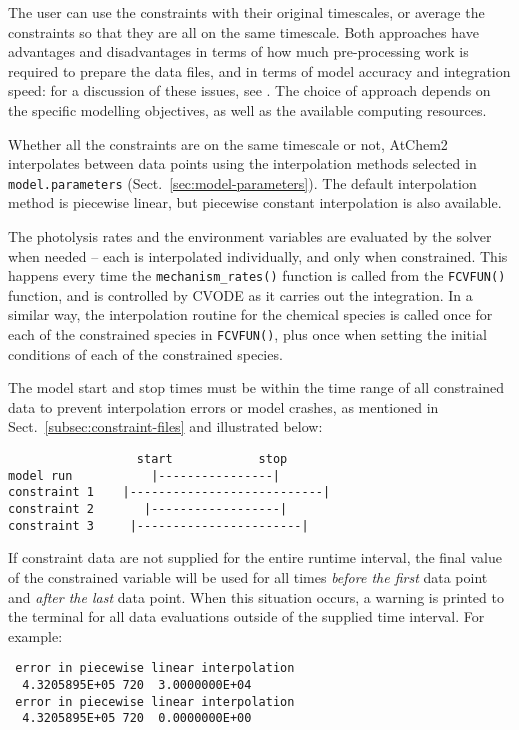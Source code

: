 The user can use the constraints with their original timescales, or
average the constraints so that they are all on the same timescale.
Both approaches have advantages and disadvantages in terms of how much
pre-processing work is required to prepare the data files, and in
terms of model accuracy and integration speed: for a discussion of
these issues, see \citet{sommariva_2020}. The choice of approach
depends on the specific modelling objectives, as well as the available
computing resources.

Whether all the constraints are on the same timescale or not, AtChem2
interpolates between data points using the interpolation methods
selected in \texttt{model.parameters} (Sect.~\ref{sec:model-parameters}).
The default interpolation method is piecewise linear, but piecewise
constant interpolation is also available.

The photolysis rates and the environment variables are evaluated by the
solver when needed -- each is interpolated individually, and only when
constrained. This happens every time the \texttt{mechanism\_rates()}
function is called from the \texttt{FCVFUN()} function, and is
controlled by CVODE as it carries out the integration. In a similar
way, the interpolation routine for the chemical species is called once
for each of the constrained species in \texttt{FCVFUN()}, plus once
when setting the initial conditions of each of the constrained
species.

The model start and stop times must be within the time range of all
constrained data to prevent interpolation errors or model crashes, as
mentioned in Sect.~\ref{subsec:constraint-files} and illustrated
below:

\begin{verbatim}
                  start            stop
model run           |----------------|
constraint 1    |---------------------------|
constraint 2       |------------------|
constraint 3     |-----------------------|
\end{verbatim}

If constraint data are not supplied for the entire runtime interval,
the final value of the constrained variable will be used for all times
\emph{before the first} data point and \emph{after the last} data
point. When this situation occurs, a warning is printed to the
terminal for all data evaluations outside of the supplied time
interval. For example:

\begin{verbatim}
 error in piecewise linear interpolation
  4.3205895E+05 720  3.0000000E+04
 error in piecewise linear interpolation
  4.3205895E+05 720  0.0000000E+00
\end{verbatim}

